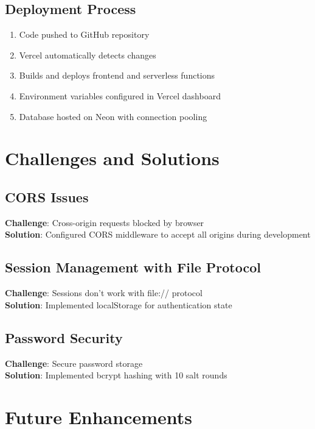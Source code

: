 \documentclass[12pt,a4paper]{article}
\begin{document}
\subsection{Deployment Process}
\begin{enumerate}
    \item Code pushed to GitHub repository
    \item Vercel automatically detects changes
    \item Builds and deploys frontend and serverless functions
    \item Environment variables configured in Vercel dashboard
    \item Database hosted on Neon with connection pooling
\end{enumerate}

\section{Challenges and Solutions}

\subsection{CORS Issues}
\textbf{Challenge}: Cross-origin requests blocked by browser \\
\textbf{Solution}: Configured CORS middleware to accept all origins during development

\subsection{Session Management with File Protocol}
\textbf{Challenge}: Sessions don't work with file:// protocol \\
\textbf{Solution}: Implemented localStorage for authentication state

\subsection{Password Security}
\textbf{Challenge}: Secure password storage \\
\textbf{Solution}: Implemented bcrypt hashing with 10 salt rounds

\section{Future Enhancements}
\end{document}
